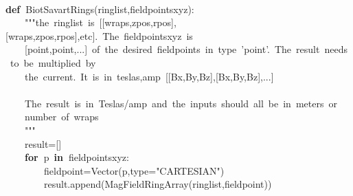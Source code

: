 \documentclass{article}
\newcommand{\hlstd}[1]{\textcolor[rgb]{0,0,0}{#1}}
\newcommand{\hlstr}[1]{\textcolor[rgb]{1,0,0}{#1}}
\newcommand{\hlsym}[1]{\textcolor[rgb]{0,0,0}{#1}}
\newcommand{\hlkwa}[1]{\textcolor[rgb]{0,0,0}{\bf{#1}}}
\newcommand{\hlkwb}[1]{\textcolor[rgb]{0.51,0,0}{#1}}
\newcommand{\hlkwd}[1]{\textcolor[rgb]{0,0,0.51}{#1}}
\begin{document}
\hspace*{\fill}\\
\hlkwa{def\ }\hlstd{}\hlkwd{Biot\textunderscore Savart\textunderscore Rings}\hlstd{}\hlsym{(}\hlstd{ringlist}\hlsym{,}\hlstd{fieldpoints\textunderscore xyz}\hlsym{):}\hspace*{\fill}\\
\hlstd{}\hlstd{\ \ \ \ }\hlstd{}\hlstr{"""the\ ringlist\ is\ {[}{[}wraps,zpos,rpos{]},{[}wraps,zpos,rpos{]},etc{]}.\ The\ fieldpoints\textunderscore xyz\ is}\hspace*{\fill}\\
\hlstr{}\hlstd{\ \ \ \ }\hlstr{{[}point,point,...{]}\ of\ the\ desired\ fieldpoints\ in\ type\ 'point'.\ The\ result\ needs\ to\ be\ multiplied\ by}\hspace*{\fill}\\
\hlstr{}\hlstd{\ \ \ \ }\hlstr{the\ current.\ It\ is\ in\ teslas,amp\ {[}{[}Bx,By,Bz{]},{[}Bx,By,Bz{]},...{]}}\hspace*{\fill}\\
\hlstr{}\hspace*{\fill}\\
\hlstr{}\hlstd{\ \ \ \ }\hlstr{The\ result\ is\ in\ Teslas/amp\ and\ the\ inputs\ should\ all\ be\ in\ meters\ or}\hspace*{\fill}\\
\hlstr{}\hlstd{\ \ \ \ }\hlstr{number\ of\ wraps}\hspace*{\fill}\\
\hlstr{}\hlstd{\ \ \ \ }\hlstr{"""}\hlstd{\hspace*{\fill}\\
}\hlstd{\ \ \ \ }\hlstd{result}\hlsym{={[}{]}}\hspace*{\fill}\\
\hlstd{}\hlstd{\ \ \ \ }\hlstd{}\hlkwa{for\ }\hlstd{p\ }\hlkwa{in\ }\hlstd{fieldpoints\textunderscore xyz}\hlsym{:}\hspace*{\fill}\\
\hlstd{}\hlstd{\ \ \ \ \ \ \ \ }\hlstd{fieldpoint}\hlsym{=}\hlstd{}\hlkwd{Vector}\hlstd{}\hlsym{(}\hlstd{p}\hlsym{,}\hlstd{}\hlkwb{type}\hlstd{}\hlsym{=}\hlstd{}\hlstr{"CARTESIAN"}\hlstd{}\hlsym{)}\hspace*{\fill}\\
\hlstd{}\hlstd{\ \ \ \ \ \ \ \ }\hlstd{result}\hlsym{.}\hlstd{}\hlkwd{append}\hlstd{}\hlsym{(}\hlstd{}\hlkwd{MagFieldRingArray}\hlstd{}\hlsym{(}\hlstd{ringlist}\hlsym{,}\hlstd{fieldpoint}\hlsym{))}\hspace*{\fill}\\
\end{document}
